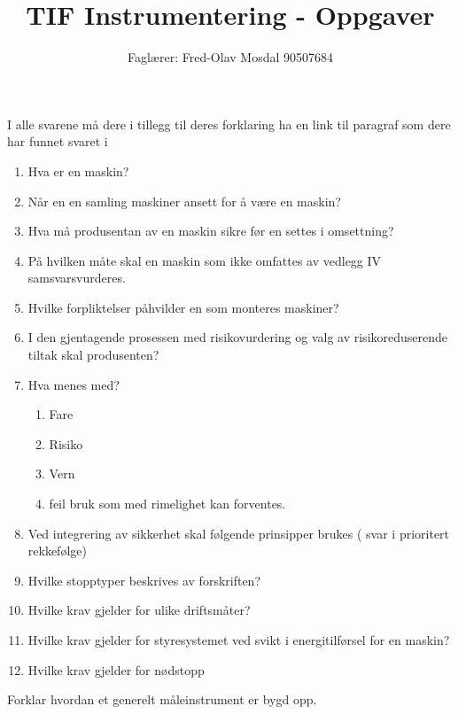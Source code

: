 \documentclass[12pt,a4paper]{article}
\def\oppgave{
		}
\begin{document}
\title{TIF Instrumentering - Oppgaver}
\author{Faglærer: Fred-Olav Mosdal 90507684\\}
\maketitle
\oppgave{}%
\vskip 2.5pt 
I alle svarene må dere i tillegg til deres forklaring ha en link til
paragraf som dere har funnet svaret i
\begin{enumerate}
\item Hva er en maskin?
\item Når en en samling maskiner ansett for å være en maskin?
\item Hva må produsentan av en maskin sikre før en settes i omsettning?
\item På hvilken måte skal en maskin som ikke omfattes av vedlegg IV samsvarsvurderes. 
\item Hvilke forpliktelser påhvilder en som monteres maskiner?
\item I den gjentagende prosessen med risikovurdering og valg av risikoreduserende
tiltak skal produsenten?
\item Hva menes med?
\begin{enumerate}
\item Fare
\item Risiko
\item Vern
\item feil bruk som med rimelighet kan forventes. 
\end{enumerate}
\item Ved integrering av sikkerhet skal følgende prinsipper brukes ( svar
i prioritert rekkefølge)
\item Hvilke stopptyper beskrives av forskriften?
\item Hvilke krav gjelder for ulike driftsmåter?
\item Hvilke krav gjelder for styresystemet ved svikt i energitilførsel
for en maskin?
\item Hvilke krav gjelder for nødstopp
\end{enumerate}
Forklar hvordan et generelt måleinstrument er bygd opp.
\vskip 5pt 
\vskip 2.5pt 
\end{document}
